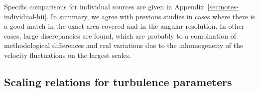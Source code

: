 \documentclass[fleqn,usenatbib, useAMS, a4paper]{mnras}
\newcounter{ionstage}
\renewcommand{\ion}[2]{\setcounter{ionstage}{#2}%
  \ensuremath{\mathrm{#1\,\scriptstyle\Roman{ionstage}}}}
\newcommand\hii{\ion{H}{2}}
\newcommand\halpha{H${\alpha}$}
\begin{document}
Specific comparisons for individual sources are given
in Appendix~\ref{sec:notes-individual-hii}.
In summary, we agree with previous studies in cases where there
is a good match in the exact area covered and in the angular resolution.
In other cases, large discrepancies are found,
which are probably to a combination of methodological differences
and real variations due to the inhomogeneity of the
velocity fluctuations on the largest scales.

\subsection{Scaling relations for turbulence parameters}\label{sec:scaling-relations}

\end{document}
